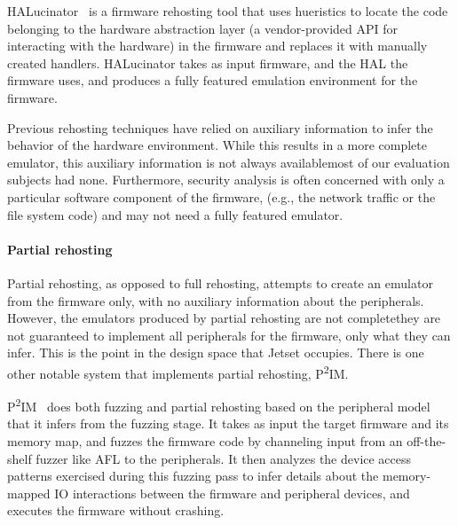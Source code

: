 HALucinator~\cite{clementshalucinator} is a firmware rehosting tool that uses hueristics to locate the code belonging to the hardware abstraction layer (a vendor-provided API for interacting with the hardware) in the firmware and replaces it with manually created handlers. 
HALucinator takes as input firmware, and the HAL the firmware uses, and produces a fully featured emulation environment for the firmware.


Previous rehosting techniques have relied on auxiliary information to infer the behavior of the hardware environment.
While this results in a more complete emulator, this auxiliary information is not always available\textemdash most of our evaluation subjects had none.
Furthermore, security analysis is often concerned with only a particular software component of the firmware, (e.g., the network traffic or the file system code) and may not need a fully featured emulator.

\paragraph{Partial rehosting}
Partial rehosting, as opposed to full rehosting, attempts to create an emulator from the firmware only, with no auxiliary information about the peripherals.
However, the emulators produced by partial rehosting are not complete\textemdash they are not guaranteed to implement all peripherals for the firmware, only what they can infer.
This is the point in the design space that Jetset occupies.
There is one other notable system that implements partial rehosting, P\textsuperscript{2}IM.

P\textsuperscript{2}IM~\cite{p2im2020} does both fuzzing and partial rehosting based on the peripheral model that it infers from the fuzzing stage.
It takes as input the target firmware and its memory map, and fuzzes the firmware code by channeling input from an off-the-shelf fuzzer like AFL to the peripherals. 
It then analyzes the device access patterns exercised during this fuzzing pass to infer details about the memory-mapped IO interactions between the firmware and peripheral devices, and executes the firmware without crashing.

